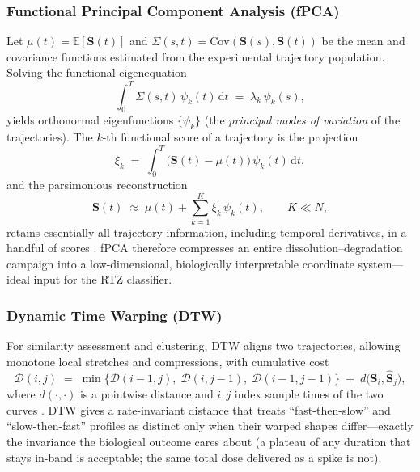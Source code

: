 \documentclass[11pt]{article}
\newcommand{\dd}{\mathrm{d}}
\begin{document}
\subsubsection{Functional Principal Component Analysis (fPCA)}
Let $\mu(t)=\mathbb{E}[\mathbf{S}(t)]$ and $\Sigma(s,t)=\mathrm{Cov}(\mathbf{S}(s),\mathbf{S}(t))$ be the mean and covariance functions estimated from the experimental trajectory population. Solving the functional eigenequation
\begin{equation}
\int_{0}^{T}\Sigma(s,t)\,\psi_k(t)\,\dd t \;=\; \lambda_k\,\psi_k(s),
\label{eq:fpca_eig}
\end{equation}
yields orthonormal eigenfunctions $\{\psi_k\}$ (the \emph{principal modes of variation} of the trajectories). The $k$-th functional score of a trajectory is the projection
\begin{equation}
\xi_k \;=\; \int_{0}^{T}\bigl(\mathbf{S}(t)-\mu(t)\bigr)\,\psi_k(t)\,\dd t,
\label{eq:fpca_score}
\end{equation}
and the parsimonious reconstruction
\begin{equation}
\mathbf{S}(t)\;\approx\; \mu(t)+\sum_{k=1}^{K}\xi_k\,\psi_k(t),\qquad K\ll N,
\label{eq:fpca_rec}
\end{equation}
retains essentially all trajectory information, including temporal derivatives, in a handful of scores \cite{Ramsay2009}. fPCA therefore compresses an entire dissolution--degradation campaign into a low-dimensional, biologically interpretable coordinate system---ideal input for the RTZ classifier.


\subsubsection{Dynamic Time Warping (DTW)}
For similarity assessment and clustering, DTW aligns two trajectories, allowing monotone local stretches and compressions, with cumulative cost
\begin{equation}
\mathcal{D}(i,j)\;=\;\min\!\bigl\{\mathcal{D}(i-1,j),\;\mathcal{D}(i,j-1),\;\mathcal{D}(i-1,j-1)\bigr\}\;+\;d\bigl(\mathbf{S}_i,\hat{\mathbf{S}}_j\bigr),
\label{eq:dtw}
\end{equation}
where $d(\cdot,\cdot)$ is a pointwise distance and $i,j$ index sample times of the two curves \cite{Sakoe1978}. DTW gives a rate-invariant distance that treats ``fast-then-slow'' and ``slow-then-fast'' profiles as distinct only when their warped shapes differ---exactly the invariance the biological outcome cares about (a plateau of any duration that stays in-band is acceptable; the same total dose delivered as a spike is not).
\end{document}
